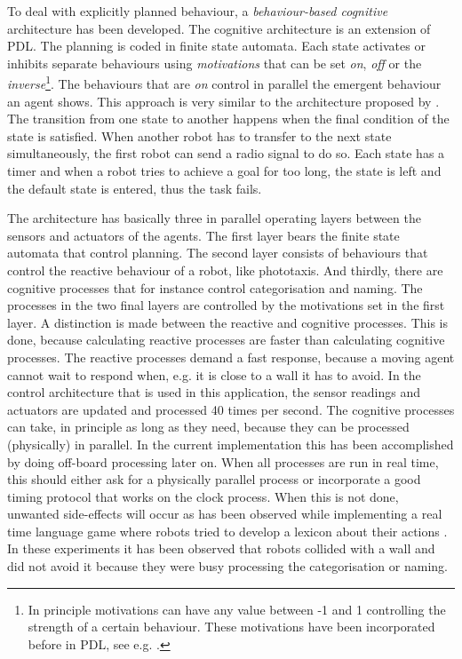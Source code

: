 To deal with explicitly planned behaviour, a {\em behaviour-based cognitive} architecture has been developed. The cognitive architecture is an extension of PDL. The planning is coded in finite state automata. Each state activates or inhibits separate behaviours using {\em motivations} that can be set {\em on}, {\em off} or the {\em inverse}\footnote{In principle motivations can have any value between -1 and 1 controlling the strength of a certain behaviour. These motivations have been incorporated before in PDL, see e.g. \citep{steels:1994,steels:1996c}.}. The behaviours that are {\em on} control in parallel the emergent behaviour an agent shows. This approach is very similar to the architecture proposed by \citep{barnesetal:1997}. The transition from one state to another happens when the final condition of the state is satisfied. When another robot has to transfer to the next state simultaneously, the first robot can send a radio signal to do so. Each state has a timer and when a robot tries to achieve a goal for too long, the state is left and the default state is entered, thus the task fails.

The architecture has basically three in parallel operating layers between the sensors and actuators of the agents. The first layer bears the finite state automata that control planning. The second layer consists of behaviours that control the reactive behaviour of a robot, like phototaxis. And thirdly, there are cognitive processes that for instance control categorisation and naming. The processes in the two final layers are controlled by the motivations set in the first layer. A distinction is made between the reactive and cognitive processes. This is done, because calculating reactive processes are faster than calculating cognitive processes. The reactive processes demand a fast response, because a moving agent cannot wait to respond when, e.g. it is close to a wall it has to avoid. In the control architecture that is used in this application, the sensor readings and actuators are updated and processed 40 times per second. The cognitive processes can take, in principle as long as they need, because they can be processed (physically) in parallel. In the current implementation this has been accomplished by doing off-board processing later on. When all processes are run in real time, this should either ask for a physically parallel process or incorporate a good timing protocol that works on the clock process. When this is not done, unwanted side-effects will occur as has been observed while implementing a real time language game where robots tried to develop a lexicon about their actions \citep{vogt:1999a,vogt:2000}. In these experiments it has been observed that robots collided with a wall and did not avoid it because they were busy processing the categorisation or naming.

